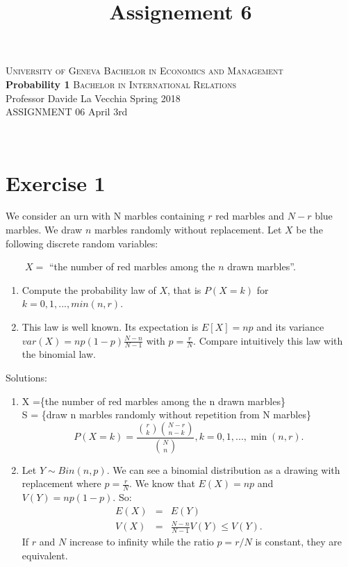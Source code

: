 \documentclass[12pt,thmsa]{article}
\title{Assignement 6}
\begin{document}
\noindent \textsc{University of Geneva}     \hfill \textsc{Bachelor in Economics and Management} \\
\textbf{Probability 1}                      \hfill \textsc{Bachelor in International Relations} \\
Professor Davide La Vecchia                 \hfill Spring 2018  \\
ASSIGNMENT 06                               \hfill   April 3rd



\noindent
\makebox[\linewidth]{\rule{\textwidth}{0.4pt}}\\[1.5ex]


\section*{Exercise 1}

We consider an urn with N marbles containing $r$ red marbles and $N-r$ blue marbles. We draw $n$ marbles randomly without replacement.
Let $X$ be the following discrete random variables:

$ \qquad X=$ ``the number of red marbles among the $n$ drawn marbles''.

\begin{enumerate}
  \item Compute the probability law of $X$, that is $P(X=k)$ for $k=0,1,...,min(n,r)$.
  \item This law is well known. Its expectation is $E[X]=np$ and its variance $var(X)=np(1-p)\frac{N-n}{N-1}$ with $p=\frac{r}{N}$.
  Compare intuitively this law with the binomial law.
\end{enumerate}
\noindent Solutions: 

\begin{enumerate}
  \item X =\{the number of red marbles among the n drawn marbles\}\\
          S = \{draw n marbles randomly without repetition from N marbles\}\\
  \begin{equation*}
  P(X=k) = \frac{\binom{r}{k} \binom{N-r}{n-k}}{\binom{N}{n}} , k=0,1,...,\min(n,r).
  \end{equation*}

  \item Let $Y \sim Bin(n,p)$. We can see a binomial distribution as a drawing with replacement where $p=\frac{r}{N}$.
  We know that $E(X)=np$ and $V(Y)=np(1-p)$. So:\begin{eqnarray*}
                                                  E(X) &=& E(Y) \\
                                                  V(X) &=& \frac{N-n}{N-1}V(Y) \leq V(Y).
                                                \end{eqnarray*}
  If $r$ and $N$ increase to infinity while the ratio $p=r/N$ is constant, they are equivalent.
\end{enumerate}
\end{document}
